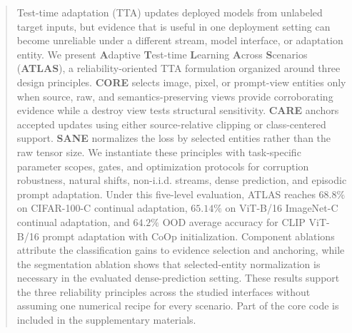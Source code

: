 \begin{abstract}
Test-time adaptation (TTA) updates deployed models from unlabeled target inputs, but evidence that is useful in one deployment setting can become unreliable under a different stream, model interface, or adaptation entity. We present \textbf{A}daptive \textbf{T}est-time \textbf{L}earning \textbf{A}cross \textbf{S}cenarios (\textbf{ATLAS}), a reliability-oriented TTA formulation organized around three design principles. \textbf{CORE} selects image, pixel, or prompt-view entities only when source, raw, and semantics-preserving views provide corroborating evidence while a destroy view tests structural sensitivity. \textbf{CARE} anchors accepted updates using either source-relative clipping or class-centered support. \textbf{SANE} normalizes the loss by selected entities rather than the raw tensor size. We instantiate these principles with task-specific parameter scopes, gates, and optimization protocols for corruption robustness, natural shifts, non-i.i.d. streams, dense prediction, and episodic prompt adaptation. Under this five-level evaluation, ATLAS reaches $68.8\%$ on CIFAR-100-C continual adaptation, $65.14\%$ on ViT-B/16 ImageNet-C continual adaptation, and $64.2\%$ OOD average accuracy for CLIP ViT-B/16 prompt adaptation with CoOp initialization. Component ablations attribute the classification gains to evidence selection and anchoring, while the segmentation ablation shows that selected-entity normalization is necessary in the evaluated dense-prediction setting. These results support the three reliability principles across the studied interfaces without assuming one numerical recipe for every scenario. Part of the core code is included in the supplementary materials.
\end{abstract}
